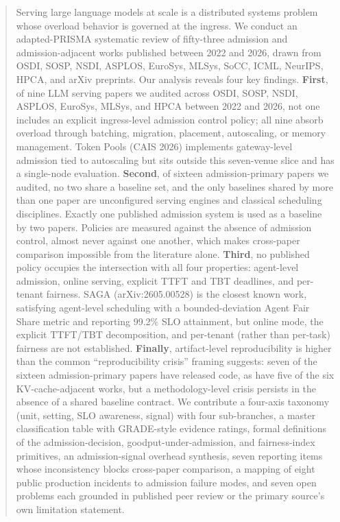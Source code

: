 \documentclass[11pt,letterpaper]{article}
\theoremstyle{definition}
\begin{document}
\begin{abstract}
\noindent
Serving large language models at scale is a distributed systems problem
whose overload behavior is governed at the ingress. We conduct an
adapted-PRISMA systematic review of fifty-three admission and
admission-adjacent works published between 2022 and 2026, drawn from
OSDI, SOSP, NSDI, ASPLOS, EuroSys, MLSys, SoCC, ICML, NeurIPS, HPCA,
and arXiv preprints. Our analysis reveals four key findings.
\textbf{First}, of nine LLM serving papers we audited across
OSDI, SOSP, NSDI, ASPLOS, EuroSys, MLSys, and HPCA between 2022 and
2026, not one includes an explicit ingress-level admission control
policy; all nine absorb overload through batching, migration,
placement, autoscaling, or memory management. Token Pools (CAIS
2026) implements gateway-level admission tied to autoscaling but
sits outside this seven-venue slice and has a single-node
evaluation. \textbf{Second}, of sixteen
admission-primary papers we audited, no two share a baseline
set, and the only baselines shared by more than one paper are
unconfigured serving engines and classical scheduling disciplines.
Exactly one published admission system is used as a baseline by two
papers. Policies are measured against the absence of admission control,
almost never against one another, which makes cross-paper comparison
impossible from the literature alone. \textbf{Third}, no
published policy occupies the intersection with all four properties:
agent-level admission, online serving, explicit TTFT and TBT
deadlines, and per-tenant fairness. SAGA (arXiv:2605.00528) is the
closest known work, satisfying agent-level scheduling with a
bounded-deviation Agent Fair Share metric and reporting 99.2\% SLO
attainment, but online mode, the explicit TTFT/TBT decomposition,
and per-tenant (rather than per-task) fairness are not established. \textbf{Finally}, artifact-level reproducibility is
higher than the common ``reproducibility crisis'' framing suggests:
seven of the sixteen admission-primary papers have released code, as
have five of the six KV-cache-adjacent works, but a
methodology-level crisis persists in the absence of a shared baseline
contract. We contribute a four-axis taxonomy (unit, setting, SLO
awareness, signal) with four sub-branches, a master
classification table with GRADE-style evidence ratings, formal
definitions of the admission-decision, goodput-under-admission, and
fairness-index primitives, an admission-signal overhead synthesis, seven reporting items whose
inconsistency blocks cross-paper comparison, a mapping of eight public
production incidents to admission failure modes, and seven open
problems each grounded in published peer review or the primary
source's own limitation statement.
\end{abstract}
\end{document}
